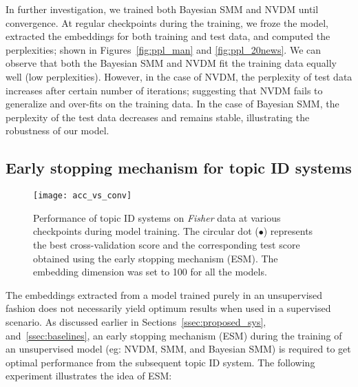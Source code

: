 \documentclass[journal]{IEEEtran}
\begin{document}
In further investigation, we trained both Bayesian SMM and NVDM until 
convergence. At regular checkpoints during the training, we froze the model, 
extracted the embeddings for both training and test data, and computed the 
perplexities; shown in Figures~\ref{fig:ppl_man} and \ref{fig:ppl_20news}. We 
can observe that both the Bayesian SMM and NVDM fit the training data equally 
well (low perplexities). However, in the case of NVDM, the perplexity of test 
data increases after certain number of iterations; suggesting that NVDM fails 
to generalize and over-fits on the training data. In the case of Bayesian SMM, 
the perplexity of the test data decreases and remains stable, illustrating the 
robustness of our model. 

\subsection{Early stopping mechanism for topic ID systems}
\label{ssec:ease_of_training}
\begin{figure*}[t!]
  \centering
  \texttt{[image: acc\_vs\_conv]}
  \caption{\label{fig:acc_conv} Performance of topic ID systems on     
  \textit{Fisher} data at various checkpoints during model training. The 
  circular dot (\(\bullet\)) represents the best cross-validation score and the 
  corresponding test score obtained using the early stopping mechanism (ESM). 
  The embedding dimension was set to 100 for all the models.} 
\end{figure*}
The embeddings extracted from a model trained purely in an unsupervised fashion 
does not necessarily yield optimum results when used in a supervised 
scenario. As discussed earlier in Sections~\ref{ssec:proposed_sys}, 
and~\ref{ssec:baselines}, an early stopping mechanism (ESM) during the training 
of an unsupervised model (eg: NVDM, SMM, and Bayesian SMM) is required to get 
optimal performance from the subsequent topic ID system. The following 
experiment illustrates the idea of ESM:
\end{document}
